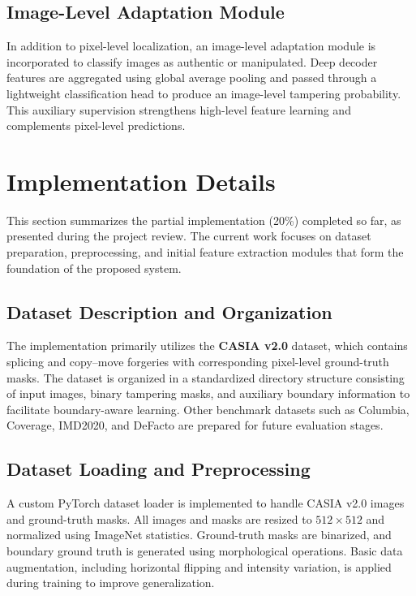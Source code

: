 \documentclass[runningheads]{llncs}
\begin{document}
\subsection{Image-Level Adaptation Module}

In addition to pixel-level localization, an image-level adaptation module is incorporated to classify images as authentic or manipulated. Deep decoder features are aggregated using global average pooling and passed through a lightweight classification head to produce an image-level tampering probability. This auxiliary supervision strengthens high-level feature learning and complements pixel-level predictions.
\section{Implementation Details}

This section summarizes the partial implementation (20\%) completed so far, as presented during the project review. The current work focuses on dataset preparation, preprocessing, and initial feature extraction modules that form the foundation of the proposed system.

\subsection{Dataset Description and Organization}

The implementation primarily utilizes the \textbf{CASIA v2.0} dataset, which contains splicing and copy--move forgeries with corresponding pixel-level ground-truth masks. The dataset is organized in a standardized directory structure consisting of input images, binary tampering masks, and auxiliary boundary information to facilitate boundary-aware learning. Other benchmark datasets such as Columbia, Coverage, IMD2020, and DeFacto are prepared for future evaluation stages.

\subsection{Dataset Loading and Preprocessing}

A custom PyTorch dataset loader is implemented to handle CASIA v2.0 images and ground-truth masks. All images and masks are resized to $512 \times 512$ and normalized using ImageNet statistics. Ground-truth masks are binarized, and boundary ground truth is generated using morphological operations. Basic data augmentation, including horizontal flipping and intensity variation, is applied during training to improve generalization.
\end{document}
